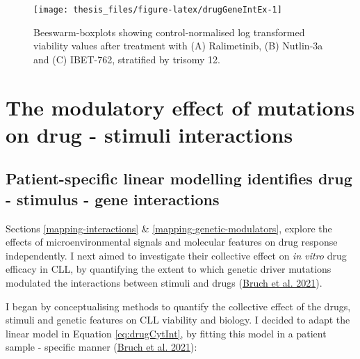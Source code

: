 \documentclass[11pt, a4paper, twosided]{book}
\begin{document}
\begin{figure}[H]

{\centering \texttt{[image: thesis\_files/figure-latex/drugGeneIntEx-1]} 

}

\caption{Beeswarm-boxplots showing control-normalised log transformed viability values after treatment with (A) Ralimetinib, (B) Nutlin-3a and (C) IBET-762, stratified by trisomy 12.}\label{fig:drugGeneIntEx}
\end{figure}
\hypertarget{drug-stimulus-gene-interactions}{%
\section{The modulatory effect of mutations on drug - stimuli interactions}\label{drug-stimulus-gene-interactions}}

\hypertarget{patient-specific-linear-modelling-identifies-drug---stimulus---gene-interactions}{%
\subsection{Patient-specific linear modelling identifies drug - stimulus - gene interactions}\label{patient-specific-linear-modelling-identifies-drug---stimulus---gene-interactions}}

Sections \ref{mapping-interactions} \& \ref{mapping-genetic-modulators}, explore the effects of microenvironmental signals and molecular features on drug response independently. I next aimed to investigate their collective effect on \emph{in vitro} drug efficacy in CLL, by quantifying the extent to which genetic driver mutations modulated the interactions between stimuli and drugs (\protect\hyperlink{ref-Giles2021}{Bruch et al. 2021}).

I began by conceptualising methods to quantify the collective effect of the drugs, stimuli and genetic features on CLL viability and biology. I decided to adapt the linear model in Equation \eqref{eq:drugCytInt}, by fitting this model in a patient sample - specific manner (\protect\hyperlink{ref-Giles2021}{Bruch et al. 2021}):
\end{document}
